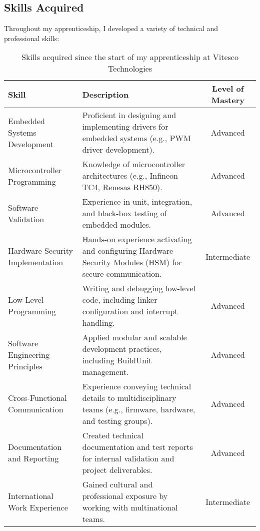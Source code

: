\subsection{Skills Acquired}
Throughout my apprenticeship, I developed a variety of technical and professional skills:
\begin{table}[H]
    \centering
    \renewcommand{\arraystretch}{1.5} %
    \begin{tabular}{|p{3.5cm}|p{8cm}|c|}
        \hline
        \rowcolor[gray]{0.8}
        \textbf{Skill} & \textbf{Description} & \textbf{Level of Mastery} \\
        \hline
        Embedded Systems Development & Proficient in designing and implementing drivers for embedded systems (e.g., PWM driver development). & Advanced \\
        \hline
        Microcontroller Programming & Knowledge of microcontroller architectures (e.g., Infineon TC4, Renesas RH850). & Advanced \\
        \hline
        Software Validation & Experience in unit, integration, and black-box testing of embedded modules. & Advanced \\
        \hline
        Hardware Security Implementation & Hands-on experience activating and configuring Hardware Security Modules (HSM) for secure communication. & Intermediate \\
        \hline
        Low-Level Programming & Writing and debugging low-level code, including linker configuration and interrupt handling. & Advanced \\
        \hline
        Software Engineering Principles & Applied modular and scalable development practices, including BuildUnit management. & Advanced \\
        \hline
        Cross-Functional Communication & Experience conveying technical details to multidisciplinary teams (e.g., firmware, hardware, and testing groups). & Advanced \\
        \hline
        Documentation and Reporting & Created technical documentation and test reports for internal validation and project deliverables. & Advanced \\
        \hline
        International Work Experience & Gained cultural and professional exposure by working with multinational teams. & Intermediate \\
        \hline
    \end{tabular}
    \caption{Skills acquired since the start of my apprenticeship at Vitesco Technologies}
\end{table}

